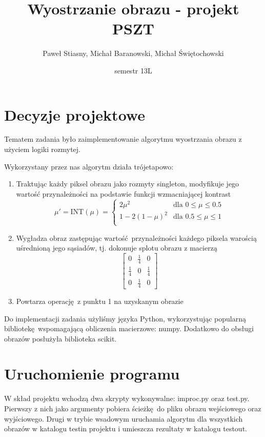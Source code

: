 \documentclass[a4paper,12pt]{article}
\begin{document}
\title{Wyostrzanie obrazu - projekt PSZT}
\date{semestr 13L}
\author{Paweł Stiasny, Michał Baranowski, Michał Świętochowski}
\maketitle

\section{Decyzje projektowe}
Tematem zadania było zaimplementowanie algorytmu wyostrzania obrazu
z użyciem logiki rozmytej.

Wykorzystany przez nas algorytm działa trójetapowo:
\begin{enumerate}
	\item Traktując każdy piksel obrazu jako rozmyty singleton, modyfikuje 
		jego wartość przynależności na podstawie funkcji wzmacniającej kontrast
		\[
			\mu' = \mbox{INT}(\mu) =
			\begin{cases}
				2 \mu^2 & \mbox{dla } 0 \leq \mu \leq 0.5 \\
				1 - 2(1 - \mu)^2  & \mbox{dla } 0.5 \leq \mu \leq 1 \\
			\end{cases}
		\]
	\item Wygładza obraz zastępując wartość przynależności każdego piksela
		warością uśrednioną jego sąsiadów, tj. dokonuje splotu obrazu
		z macierzą
		\[
			\begin{bmatrix}
				0 & \frac 1 4 & 0 \\
				\frac 1 4 & 0 & \frac 1 4 \\
				0 & \frac 1 4 & 0
			\end{bmatrix}
		\]
	\item Powtarza operację z punktu 1 na uzyskanym obrazie
\end{enumerate}

Do implementacji zadania użyliśmy języka Python, wykorzystując popularną
bibliotekę wspomagającą obliczenia macierzowe: numpy.  Dodatkowo do obsługi
obrazów posłużyła biblioteka scikit.

\section{Uruchomienie programu}
W skład projektu wchodzą dwa skrypty wykonywalne: improc.py oraz test.py.
Pierwszy z nich jako argumenty pobiera ścieżkę do pliku obrazu wejściowego
oraz wyjściowego.  Drugi w trybie wsadowym uruchamia algorytm dla wszystkich
obrazów w katalogu testin projektu i umieszcza rezultaty w katalogu testout.
\end{document}
